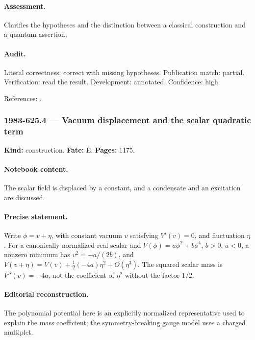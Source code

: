 \paragraph{Assessment.} Clarifies the hypotheses and the distinction between a classical construction and a quantum assertion.

\paragraph{Audit.} Literal correctness: correct with missing hypotheses. Publication match: partial. Verification: read the result. Development: annotated. Confidence: high.

\noindent References: \citep{thooft1971massive}.\par

\subsubsection{1983-625.4 --- Vacuum displacement and the scalar quadratic term}

\label{item:1983-625.4}

\noindent\textbf{Kind:} construction. \textbf{Fate:} E. \textbf{Pages:} 1175.\par

\paragraph{Notebook content.} The scalar field is displaced by a constant, and a condensate and an excitation are discussed.

\paragraph{Precise statement.} Write \(\phi=v+\eta\), with constant vacuum \(v\) satisfying \(V'(v)=0\), and fluctuation \(\eta\). For a canonically normalized real scalar and \(V(\phi)=a\phi^2+b\phi^4\), \(b>0\), \(a<0\), a nonzero minimum has \(v^2=-a/(2b)\), and \(V(v+\eta)=V(v)+\frac12(-4a)\eta^2+O(\eta^3)\). The squared scalar mass is \(V''(v)=-4a\), not the coefficient of \(\eta^2\) without the factor \(1/2\).

\paragraph{Editorial reconstruction.} The polynomial potential here is an explicitly normalized representative used to explain the mass coefficient; the symmetry-breaking gauge model uses a charged multiplet.

